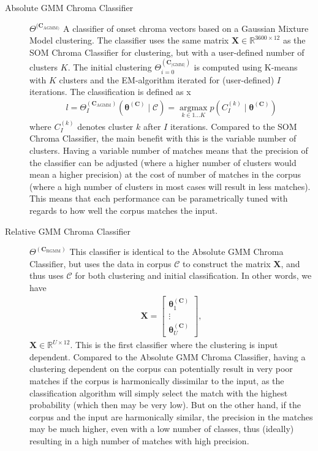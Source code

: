 \begin{description}
	 
	 \item[Absolute GMM Chroma Classifier] $\Theta^{(\bm C_{\text{AGMM})}}$ A classifier of onset chroma vectors based on a Gaussian Mixture Model clustering. The classifier uses the same matrix $\bm X \in \mathbb R^{3600\times 12}$ as the SOM Chroma Classifier for clustering, but with a user-defined number of clusters $K$. The initial clustering $\Theta^{(\bm C_{\lvert \text{GMM} \rvert})}_{i=0}$ is computed using K-means \cite{bishop2006pattern} with $K$ clusters and the EM-algorithm iterated for (user-defined) $I$ iterations. The classification is defined as	 
	 x\begin{align}
	 	l = \Theta^{(\bm C_{\text{AGMM}})}_I \left(\bm\theta^{(\bm C)} \mid \mathcal C\right) = \operatorname*{argmax}_{k \in 1\dots K} p\left( C^{(k)}_I \mid \bm \theta^{(\bm C)} \right)
	 \end{align}
	 where $C^{(k)}_I$ denotes cluster $k$ after $I$ iterations. Compared to the SOM Chroma Classifier, the main benefit with this is the variable number of clusters. Having a variable number of matches means that the precision of the classifier can be adjusted (where a higher number of clusters would mean a higher precision) at the cost of number of matches in the corpus (where a high number of clusters in most cases will result in less matches). This means that each performance can be parametrically tuned with regards to how well the corpus matches the input.
	 
	 
	 \item[Relative GMM Chroma Classifier] $\Theta^{(\bm C_\text{RGMM})}$ This classifier is identical to the Absolute GMM Chroma Classifier, but uses the data in corpus $\mathcal C$ to construct the matrix $\bm X$, and thus uses $\mathcal C$ for both clustering and initial classification. In other words, we have
	 \begin{align}
	 	\bm X = \begin{bmatrix} \bm\theta^{(\bm C)}_1 \\ \vdots \\ \bm\theta^{(\bm C)}_U	\end{bmatrix},
	 \end{align}
$\bm X \in \mathbb R^{U\times 12}$. This is the first classifier where the clustering is input dependent. Compared to the Absolute GMM Chroma Classifier, having a clustering dependent on the corpus can potentially result in very poor matches if the corpus is harmonically dissimilar to the input, as the classification algorithm will simply select the match with the highest probability (which then may be very low). But on the other hand, if the corpus and the input are harmonically similar, the precision in the matches may be much higher, even with a low number of classes, thus (ideally) resulting in a high number of matches with high precision.
	 
 \end{description}
 

